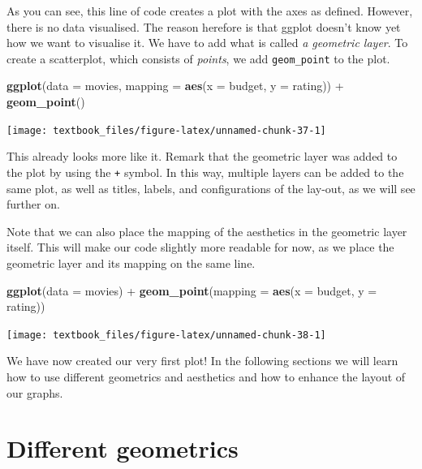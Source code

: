 \documentclass[]{tufte-book}
\newenvironment{Shaded}{}{}
\newcommand{\DataTypeTok}[1]{\textcolor[rgb]{0.56,0.13,0.00}{#1}}
\newcommand{\KeywordTok}[1]{\textcolor[rgb]{0.00,0.44,0.13}{\textbf{#1}}}
\newcommand{\NormalTok}[1]{#1}
\newcommand{\OperatorTok}[1]{\textcolor[rgb]{0.40,0.40,0.40}{#1}}
\newcommand{\StringTok}[1]{\textcolor[rgb]{0.25,0.44,0.63}{#1}}
\begin{document}
As you can see, this line of code creates a plot with the axes as defined. However, there is no data visualised. The reason herefore is that ggplot doesn't know yet how we want to visualise it. We have to add what is called \emph{a geometric layer}. To create a scatterplot, which consists of \emph{points}, we add \texttt{geom\_point} to the plot.

\begin{Shaded}
\begin{Highlighting}[]
\KeywordTok{ggplot}\NormalTok{(}\DataTypeTok{data =}\NormalTok{ movies, }\DataTypeTok{mapping =} \KeywordTok{aes}\NormalTok{(}\DataTypeTok{x =}\NormalTok{ budget, }\DataTypeTok{y =}\NormalTok{ rating)) }\OperatorTok{+}
\StringTok{    }\KeywordTok{geom_point}\NormalTok{()}
\end{Highlighting}
\end{Shaded}

\texttt{[image: textbook\_files/figure-latex/unnamed-chunk-37-1]}

This already looks more like it. Remark that the geometric layer was added to the plot by using the \texttt{+} symbol. In this way, multiple layers can be added to the same plot, as well as titles, labels, and configurations of the lay-out, as we will see further on.

Note that we can also place the mapping of the aesthetics in the geometric layer itself. This will make our code slightly more readable for now, as we place the geometric layer and its mapping on the same line.

\begin{Shaded}
\begin{Highlighting}[]
\KeywordTok{ggplot}\NormalTok{(}\DataTypeTok{data =}\NormalTok{ movies) }\OperatorTok{+}
\StringTok{    }\KeywordTok{geom_point}\NormalTok{(}\DataTypeTok{mapping =} \KeywordTok{aes}\NormalTok{(}\DataTypeTok{x =}\NormalTok{ budget, }\DataTypeTok{y =}\NormalTok{ rating))}
\end{Highlighting}
\end{Shaded}

\texttt{[image: textbook\_files/figure-latex/unnamed-chunk-38-1]}

We have now created our very first plot! In the following sections we will learn how to use different geometrics and aesthetics and how to enhance the layout of our graphs.

\hypertarget{different-geometrics}{%
\section{Different geometrics}\label{different-geometrics}}
\end{document}
